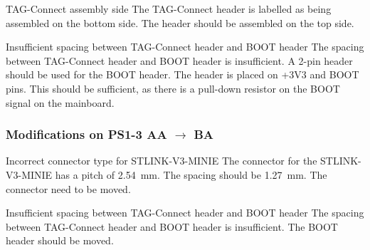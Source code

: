 \begin{ModTable}

\ModItemOpen
{TAG-Connect assembly side}
{The TAG-Connect header is labelled as being assembled on the bottom side. }
{The header should be assembled on the top side. }
{}
{}

\ModItemOpen
{Insufficient spacing between TAG-Connect header and BOOT header}
{The spacing between TAG-Connect header and BOOT header is insufficient. }
{A 2-pin header should be used for the BOOT header. The header is placed on +3V3 and BOOT pins. This should be sufficient, as there is a pull-down resistor on the BOOT signal on the mainboard. }
{}
{}

\end{ModTable}

\FloatBarrier

\subsubsection{Modifications on PS1-3 AA $\to$ BA}

\begin{ModTable}

\ModItemOpen
{Incorrect connector type for STLINK-V3-MINIE}
{The connector for the STLINK-V3-MINIE has a pitch of \qty{2.54}{\milli\meter}. The spacing should be \qty{1.27}{\milli\meter}. }
{The connector need to be moved. }
{}
{}

\ModItemOpen
{Insufficient spacing between TAG-Connect header and BOOT header}
{The spacing between TAG-Connect header and BOOT header is insufficient. }
{The BOOT header should be moved. }
{}
{}

\end{ModTable}

\FloatBarrier

